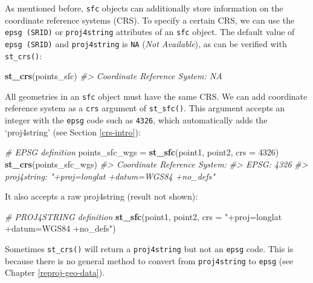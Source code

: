 \documentclass[]{krantz}
\newenvironment{Shaded}{\begin{snugshade}}{\end{snugshade}}
\newcommand{\CommentTok}[1]{\textcolor[rgb]{0.37,0.37,0.37}{\textit{#1}}}
\newcommand{\DataTypeTok}[1]{\textcolor[rgb]{0.27,0.27,0.27}{#1}}
\newcommand{\DecValTok}[1]{\textcolor[rgb]{0.06,0.06,0.06}{#1}}
\newcommand{\KeywordTok}[1]{\textcolor[rgb]{0.27,0.27,0.27}{\textbf{#1}}}
\newcommand{\NormalTok}[1]{#1}
\newcommand{\StringTok}[1]{\textcolor[rgb]{0.5,0.5,0.5}{#1}}
\let\BeginKnitrBlock\begin \let\EndKnitrBlock\end
\begin{document}
As mentioned before, \texttt{sfc} objects can additionally store information on the coordinate reference systems (CRS).
To specify a certain CRS, we can use the \texttt{epsg\ (SRID)} or \texttt{proj4string} attributes of an \texttt{sfc} object.
The default value of \texttt{epsg\ (SRID)} and \texttt{proj4string} is \texttt{NA} (\emph{Not Available}), as can be verified with \texttt{st\_crs()}:

\begin{Shaded}
\begin{Highlighting}[]
\KeywordTok{st_crs}\NormalTok{(points_sfc)}
\CommentTok{#> Coordinate Reference System: NA}
\end{Highlighting}
\end{Shaded}

All geometries in an \texttt{sfc} object must have the same CRS.
We can add coordinate reference system as a \texttt{crs} argument of \texttt{st\_sfc()}.
This argument accepts an integer with the \texttt{epsg} code such as \texttt{4326}, which automatically adds the `proj4string' (see Section \ref{crs-intro}):

\begin{Shaded}
\begin{Highlighting}[]
\CommentTok{# EPSG definition}
\NormalTok{points_sfc_wgs =}\StringTok{ }\KeywordTok{st_sfc}\NormalTok{(point1, point2, }\DataTypeTok{crs =} \DecValTok{4326}\NormalTok{)}
\KeywordTok{st_crs}\NormalTok{(points_sfc_wgs)}
\CommentTok{#> Coordinate Reference System:}
\CommentTok{#>   EPSG: 4326 }
\CommentTok{#>   proj4string: "+proj=longlat +datum=WGS84 +no_defs"}
\end{Highlighting}
\end{Shaded}

It also accepts a raw proj4string (result not shown):

\begin{Shaded}
\begin{Highlighting}[]
\CommentTok{# PROJ4STRING definition}
\KeywordTok{st_sfc}\NormalTok{(point1, point2, }\DataTypeTok{crs =} \StringTok{"+proj=longlat +datum=WGS84 +no_defs"}\NormalTok{)}
\end{Highlighting}
\end{Shaded}

\BeginKnitrBlock{rmdnote}
Sometimes \texttt{st\_crs()} will return a \texttt{proj4string} but not an \texttt{epsg} code.
This is because there is no general method to convert from \texttt{proj4string} to \texttt{epsg} (see Chapter \ref{reproj-geo-data}).
\EndKnitrBlock{rmdnote}
\end{document}

